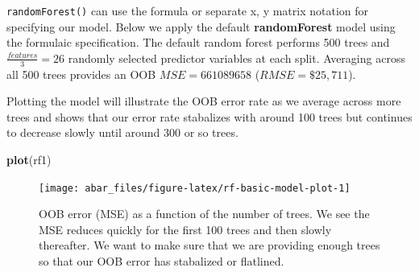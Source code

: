 \documentclass[]{book}
\newenvironment{Shaded}{\begin{snugshade}}{\end{snugshade}}
\newcommand{\CommentTok}[1]{\textcolor[rgb]{0.56,0.35,0.01}{\textit{#1}}}
\newcommand{\DataTypeTok}[1]{\textcolor[rgb]{0.13,0.29,0.53}{#1}}
\newcommand{\DecValTok}[1]{\textcolor[rgb]{0.00,0.00,0.81}{#1}}
\newcommand{\KeywordTok}[1]{\textcolor[rgb]{0.13,0.29,0.53}{\textbf{#1}}}
\newcommand{\NormalTok}[1]{#1}
\newcommand{\OperatorTok}[1]{\textcolor[rgb]{0.81,0.36,0.00}{\textbf{#1}}}
\newcommand{\StringTok}[1]{\textcolor[rgb]{0.31,0.60,0.02}{#1}}
\theoremstyle{definition}
\theoremstyle{definition}
\theoremstyle{definition}
\theoremstyle{remark}
\begin{document}
\texttt{randomForest()} can use the formula or separate x, y matrix
notation for specifying our model. Below we apply the default
\textbf{randomForest} model using the formulaic specification. The
default random forest performs 500 trees and \(\frac{features}{3} = 26\)
randomly selected predictor variables at each split. Averaging across
all 500 trees provides an OOB \(MSE = 661089658\) (\(RMSE = \$25,711\)).

\begin{Shaded}
\end{Shaded}

Plotting the model will illustrate the OOB error rate as we average
across more trees and shows that our error rate stabalizes with around
100 trees but continues to decrease slowly until around 300 or so trees.

\begin{Shaded}
\begin{Highlighting}[]
\KeywordTok{plot}\NormalTok{(rf1)}
\end{Highlighting}
\end{Shaded}

\begin{figure}

{\centering \texttt{[image: abar\_files/figure-latex/rf-basic-model-plot-1]} 

}

\caption{OOB error (MSE) as a function of the number of trees.  We see the MSE reduces quickly for the first 100 trees and then slowly thereafter.  We want to make sure that we are providing enough trees so that our OOB error has stabalized or flatlined.}\label{fig:rf-basic-model-plot}
\end{figure}
\end{document}
